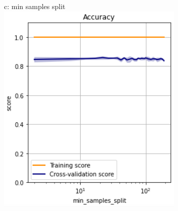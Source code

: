 \documentclass{article}
\begin{document}
\begin{figure}
\begin{subfigure}{.19\textwidth}
	\end{subfigure}
	\begin{subfigure}{.19\textwidth}
		\centering
		c: min samples split\\
		\includegraphics[width=\linewidth]{poland_xgb_min_samples_split_accuracy.png}
		

\end{subfigure}
\end{figure}
\end{document}
